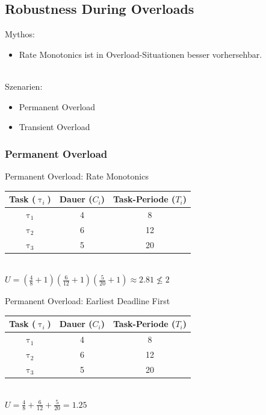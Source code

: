 \subsection{Robustness During Overloads}\label{RobustnessDuringOverloads}

\begin{frame}{\subsecname}
	Mythos:
	\begin{itemize}
		\item Rate Monotonics ist in Overload-Situationen besser vorhersehbar.
	\end{itemize}$ $\\\pause
	Szenarien:
	\begin{itemize}
		\item Permanent Overload
		\item Transient Overload
	\end{itemize}
\end{frame}

\subsubsection{Permanent Overload}
\begin{frame}{Permanent Overload: Rate Monotonics}
	\begin{center}
		\begin{tabular}{c||c|c}
			Task ($\uptau_i$) & Dauer ($C_i$) & Task-Periode ($T_i$)\\\hline\hline
			$\uptau_1$ & 4 & 8\\
			$\uptau_2$ & 6 & 12\\
			$\uptau_3$ & 5 & 20
		\end{tabular}\\[2ex]\pause
		$U=(\frac{4}{8}+1)(\frac{6}{12}+1)(\frac{5}{20}+1)\approx 2.81 \nleq 2$\pause
		
	\end{center}
\end{frame}

\begin{frame}{Permanent Overload: Earliest Deadline First}
	\begin{center}
		\begin{tabular}{c||c|c}
			Task ($\uptau_i$) & Dauer ($C_i$) & Task-Periode ($T_i$)\\\hline\hline
			$\uptau_1$ & 4 & 8\\
			$\uptau_2$ & 6 & 12\\
			$\uptau_3$ & 5 & 20
		\end{tabular}\\[2ex]\pause
		$U=\frac{4}{8}+\frac{6}{12}+\frac{5}{20}=1.25$\pause
	
	\end{center}
\end{frame}

